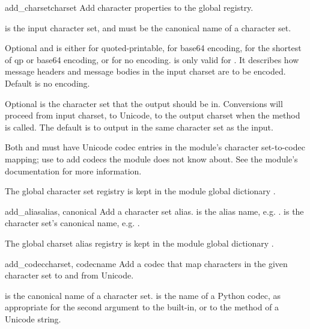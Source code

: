 \begin{funcdesc}{add_charset}{charset}
Add character properties to the global registry.

 is the input character set, and must be the canonical
name of a character set.

Optional  and  is either
 for quoted-printable,  for
base64 encoding,  for the shortest of qp or
base64 encoding, or  for no encoding.   is
only valid for .  It describes how message headers and
message bodies in the input charset are to be encoded.  Default is no
encoding.

Optional  is the character set that the output
should be in.  Conversions will proceed from input charset, to
Unicode, to the output charset when the method
 is called.  The default is to output in the
same character set as the input.

Both  and  must have Unicode
codec entries in the module's character set-to-codec mapping; use
 to add codecs the module does
not know about.  See the  module's documentation for
more information.

The global character set registry is kept in the module global
dictionary .
\end{funcdesc}

\begin{funcdesc}{add_alias}{alias, canonical}
Add a character set alias.   is the alias name,
e.g. .   is the character set's canonical
name, e.g. .

The global charset alias registry is kept in the module global
dictionary .
\end{funcdesc}

\begin{funcdesc}{add_codec}{charset, codecname}
Add a codec that map characters in the given character set to and from
Unicode.

 is the canonical name of a character set.
 is the name of a Python codec, as appropriate for the
second argument to the  built-in, or to the
 method of a Unicode string.
\end{funcdesc}
